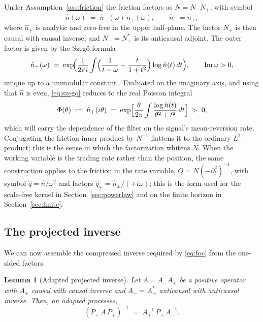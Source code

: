 \documentclass[11pt]{article}
\theoremstyle{plain}
\newtheorem{lemma}{Lemma}
\theoremstyle{definition}
\theoremstyle{remark}
\begin{document}
Under Assumption~\ref{ass:friction} the friction factors as $N=N_-N_+$, with symbol
\begin{equation}\label{eq:wh}
\hat n(\omega) \;=\; \hat n_-(\omega)\,\hat n_+(\omega), \qquad \hat n_-=\overline{\hat n_+},
\end{equation}
where $\hat n_+$ is analytic and zero-free in the upper half-plane. The factor $N_+$ is then causal with causal inverse, and $N_-=N_+^\ast$ is its anticausal adjoint. The outer factor is given by the Szeg\H{o} formula
\begin{equation}\label{eq:szego}
\hat n_+(\omega) \;=\; \exp\!\Bigl(\frac{1}{2\pi i}\int\Bigl(\frac{1}{t-\omega}-\frac{t}{1+t^2}\Bigr)\log\hat n(t)\,dt\Bigr),
\qquad \operatorname{Im}\omega>0,
\end{equation}
unique up to a unimodular constant \citep{Krein1962}. Evaluated on the imaginary axis, and using that $\hat n$ is even, \eqref{eq:szego} reduces to the real Poisson integral
\begin{equation}\label{eq:phi}
\Phi(\theta) \;:=\; \hat n_+(i\theta) \;=\; \exp\Bigl[\frac{\theta}{2\pi}\int\frac{\log\hat n(t)}{\theta^2+t^2}\,dt\Bigr] \;>\;0,
\end{equation}
which will carry the dependence of the filter on the signal's mean-reversion rate. Conjugating the friction inner product by $N_-^{-1}$ flattens it to the ordinary $L^2$ product; this is the sense in which the factorization whitens $N$. When the working variable is the trading rate rather than the position, the same construction applies to the friction in the rate variable, $Q=N(-\partial_t^2)^{-1}$, with symbol $\hat q=\hat n/\omega^2$ and factors $\hat q_\pm=\hat n_\pm/(\mp i\omega)$; this is the form used for the scale-free kernel in Section~\ref{sec:powerlaw} and on the finite horizon in Section~\ref{sec:finite}.

\subsection{The projected inverse}\label{sec:pi}

We can now assemble the compressed inverse required by \eqref{eq:foc} from the one-sided factors.

\begin{lemma}[Adapted projected inverse]\label{lem:pi}
Let $A=A_-A_+$ be a positive operator with $A_+$ causal with causal inverse and $A_-=A_+^\ast$ anticausal with anticausal inverse. Then, on adapted processes,
\begin{equation}\label{eq:pi}
(P_+\,A\,P_+)^{-1} \;=\; A_+^{-1}\,P_+\,A_-^{-1}.
\end{equation}
\end{lemma}
\end{document}
